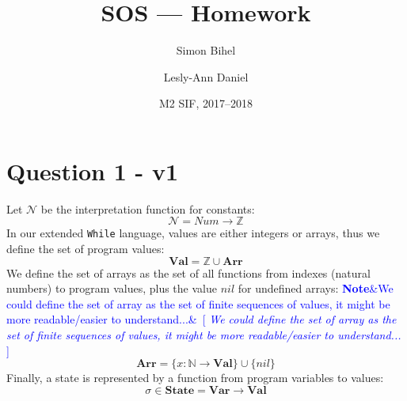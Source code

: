 \documentclass{article}
\title{SOS --- Homework}
\author{Simon Bihel \and Lesly-Ann Daniel}
\date{M2 SIF, 2017--2018}
\newcommand{\note}[1]{\textcolor{blue}{\textbf{Note}\ifx&#1&\else ~[ \emph{#1} ]~\fi}}
\begin{document}
\maketitle

\section*{Question 1 - v1}
Let \(\mathcal{N}\) be the interpretation function for constants:
\[ \mathcal{N} = Num \rightarrow \mathbb{Z} \]
In our extended \texttt{While} language, values are either integers or arrays, thus we define the set of program values:
\[ \textbf{Val} = \mathbb{Z} \cup \textbf{Arr}\]
We define the set of arrays as the set of all functions from indexes (natural numbers) to program values, plus the value \(nil\) for undefined arrays: \note{We could define the set of array as the set of finite sequences of values, it might be more readable/easier to understand...}
\[\textbf{Arr} = \{x:\mathbb{N} \rightarrow \textbf{Val}\} \cup \{nil\} \]
Finally, a state is represented by a function from program variables to values:
\[\sigma \in \textbf{State} = \textbf{Var} \rightarrow \textbf{Val} \]
\end{document}
